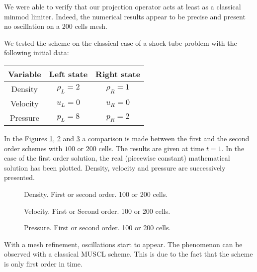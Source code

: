 \documentclass{fldauth}
\theoremstyle{plain}
\theoremstyle{plain}
\theoremstyle{plain}
\theoremstyle{plain}
\theoremstyle{plain}
\theoremstyle{plain}
\begin{document}
We were able to verify that our projection operator acts at least
as a classical minmod limiter. Indeed, the numerical results
appear to be precise and present no oscillation on a 200 cells
mesh.

We tested the scheme on the classical case of a shock tube problem
with the following initial data:
\begin{center}
\begin{tabular}{|c|c|c|}
\hline Variable & Left state & Right state \\
\hline  Density & $\rho_L=2$ & $\rho_R=1$\\
\hline  Velocity & $u_L=0$ & $u_R=0$\\
\hline Pressure & $p_L=8$ & $p_R=2$\\
\hline
\end{tabular}
\end{center}

 In the Figures \ref{figrho}, \ref{figvit} and \ref{figpres} a comparison
is made between the first and the second order schemes with \( 100
\) or \( 200 \) cells. The results are given at time \( t=1 \). In
the case of the first order solution, the real (piecewise
constant) mathematical solution has been plotted. Density,
velocity and pressure are successively presented.
\begin{figure}[b]


\caption{Density. First or second order. 100 or 200 cells.\label{figrho}}
\end{figure}

\begin{figure}[b]


\caption{Velocity. First or Second order. 100 or 200
cells.\label{figvit}}
\end{figure}

\begin{figure}[b]


\caption{Pressure. First or second order. 100 or 200 cells.\label{figpres}}
\end{figure}

With a mesh refinement, oscillations start to appear. The
phenomenon can be observed with a classical MUSCL scheme. This is
due to the fact that the scheme is only first order in time.
\end{document}
